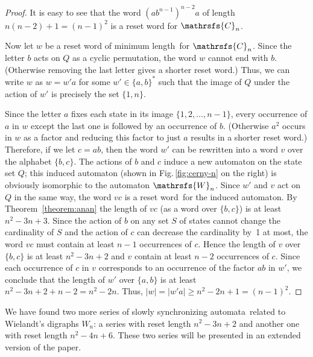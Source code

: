 \documentclass[11pt]{llncs}
\newcommand{\sa}{synchronizing automata}
\newcommand{\sw}{reset word}
\newcommand{\ssw}{reset word of minimum length}
\begin{document}
\begin{proof}
It is easy to see that the word $(ab^{n-1})^{n-2}a$ of length
$n(n-2)+1=(n-1)^2$ is a reset word for $\mathrsfs{C}_n$.

Now let $w$ be a \ssw\ for $\mathrsfs{C}_n$. Since the letter $b$
acts on $Q$ as a cyclic permutation, the word $w$ cannot end with $b$.
(Otherwise removing the last letter gives a shorter \sw.) Thus, we can
write $w$ as $w = w'a$ for some $w'\in\{a,b\}^*$ such that the image
of $Q$ under the action of $w'$ is precisely the set $\{1,n\}$.

Since the letter $a$ fixes each state in its image $\{1,2,\dots,n-1\}$,
every occurrence of $a$ in $w$ except the last one is followed by an
occurrence of $b$. (Otherwise $a^2$ occurs in $w$ as a factor and
reducing this factor to just $a$ results in a shorter \sw.) Therefore,
if we let $c=ab$, then the word $w'$ can be rewritten into a word $v$
over the alphabet $\{b,c\}$. The actions of $b$ and $c$ induce
a new automaton on the state set $Q$; this induced automaton (shown in
Fig.\,\ref{fig:cerny-n} on the right) is obviously isomorphic to the
automaton $\mathrsfs{W}_n$. Since $w'$ and $v$ act on $Q$ in the same way,
the word $vc$ is a \sw\ for the induced automaton. By Theorem~\ref{theorem:anan}
the length of $vc$ (as a word over $\{b,c\}$) is at least $n^2-3n+3$.
Since the action of $b$ on any set $S$ of states cannot change the
cardinality of $S$ and the action of $c$ can decrease the cardinality
by~1 at most, the word $vc$ must contain at least $n-1$ occurrences of
$c$. Hence the length of $v$ over $\{b,c\}$ is at least $n^2-3n+2$ and
$v$ contain at least $n-2$ occurrences of $c$. Since each occurrence of
$c$ in $v$ corresponds to an occurrence of the factor $ab$ in $w'$, we
conclude that the length of $w'$ over $\{a,b\}$ is at least $n^2-3n+2+n-2=n^2-2n$.
Thus, $|w|=|w'a|\ge n^2-2n+1=(n-1)^2$.
\end{proof}

We have found two more series of slowly \sa\ related to Wielandt's digraphs
$W_n$: a series with reset length $n^2-3n+2$ and another one with reset length
$n^2-4n+6$. These two series will be presented in an extended version of
the paper.
\end{document}
